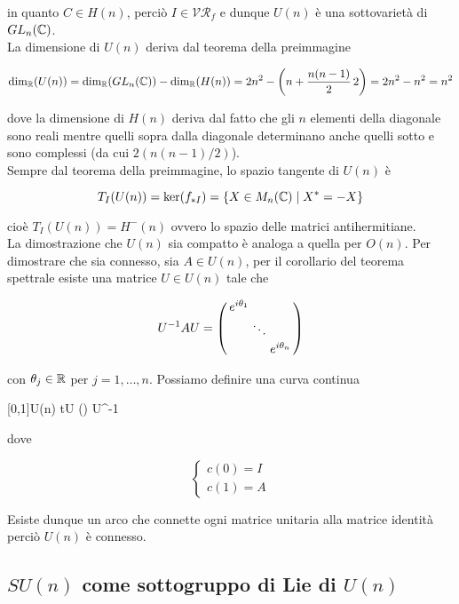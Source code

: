 in quanto $ C \in H(n) $, perciò $ I \in \mathcal{VR}_{f} $ e dunque $ U(n) $ è una sottovarietà di $ GL_{n}(\mathbb{C}) $.\\
La dimensione di $ U(n) $ deriva dal teorema della preimmagine

\begin{equation}
	\dim_{\mathbb{R}}(U(n)) = \dim_{\mathbb{R}}(GL_{n}(\mathbb{C})) - \dim_{\mathbb{R}}(H(n)) = 2 n^{2} - \left( n +\dfrac{n (n-1)}{2} \, 2 \right) = 2 n^{2} - n^{2} = n^{2}
\end{equation}

dove la dimensione di $ H(n) $ deriva dal fatto che gli $ n $ elementi della diagonale sono reali mentre quelli sopra dalla diagonale determinano anche quelli sotto e sono complessi (da cui $ 2 (n(n-1)/2) $).\\
Sempre dal teorema della preimmagine, lo spazio tangente di $ U(n) $ è

\begin{equation}
	T_{I}(U(n)) = \ker(f_{*I}) = \{ X \in M_{n}(\mathbb{C}) \mid X^{*} = -X \}
\end{equation}

cioè $ T_{I}(U(n)) = H^{-}(n) $ ovvero lo spazio delle matrici antihermitiane.\\
La dimostrazione che $ U(n) $ sia compatto è analoga a quella per $ O(n) $. Per dimostrare che sia connesso, sia $ A \in U(n) $, per il corollario del teorema spettrale esiste una matrice $ U \in U(n) $ tale che

\begin{equation}
	U^{-1} A U = %
	\smqty(\dmat{ e^{i \theta_{1}}, \ddots, e^{i \theta_{n}} })
\end{equation}

con $ \theta_{j} \in \mathbb{R} $ per $ j=1,\dots,n $. Possiamo definire una curva continua

%
	{[0,1]}{U(n)}%
	{t}{U \smqty() U^{-1}}

dove

\begin{equation}
	\begin{cases}
		c(0) = I\\
		c(1) = A
	\end{cases}
\end{equation}

Esiste dunque un arco che connette ogni matrice unitaria alla matrice identità perciò $ U(n) $ è connesso.

\subsection{$ SU(n) $ come sottogruppo di Lie di $ U(n) $}

